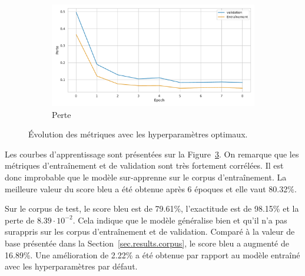 \begin{figure}[!hbt]
\begin{subfigure}{.5\textwidth}
\begin{center}
        \end{center}
        \label{fig.results.tuned.training.bleu}
    \end{subfigure}
    \begin{subfigure}{.5\textwidth}
        \begin{center}
            \includegraphics[width=\textwidth]{assets/python/tuned-loss.pdf}
        \end{center}
        \caption{Perte}
        \label{fig.results.tuned.training.loss}
    \end{subfigure}
    \caption{Évolution des métriques avec les hyperparamètres optimaux.}
    \label{fig.results.tuned.training}
\end{figure}

Les courbes d'apprentissage sont présentées sur la Figure~\ref{fig.results.tuned.training}.
On remarque que les métriques d'entraînement et de validation sont très fortement corrélées.
Il est donc improbable que le modèle sur-apprenne sur le corpus d'entraînement.
La meilleure valeur du score \gls{bleu} a été obtenue après 6 époques et elle vaut 80.32\%.

Sur le corpus de test, le score \gls{bleu} est de 79.61\%, 
l'exactitude est de 98.15\% et la perte de \(8.39\cdot 10^{-2}\).
Cela indique que le modèle généralise bien et qu'il n'a pas surappris sur les corpus d'entraînement et de validation.
Comparé à la valeur de base présentée dans la Section~\ref{sec.results.corpus},
le score \gls{bleu} a augmenté de 16.89\%.
Une amélioration de 2.22\% a été obtenue par rapport au modèle entraîné avec les hyperparamètres par défaut.

